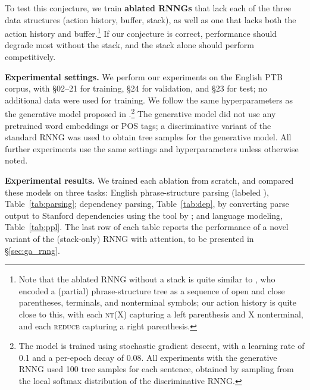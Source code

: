 \documentclass[11pt]{article}
\begin{document}
To test this conjecture, we train \textbf{ablated RNNGs} that lack each of the three data structures (action history, buffer, stack), as well as one that lacks both the action history and buffer.\footnote{Note that the ablated RNNG without a stack is quite similar to , who encoded a (partial)
 phrase-structure tree as a sequence of open and close parentheses, terminals, and nonterminal symbols; our action history is quite close to this, with each \textsc{nt}(X) capturing a left parenthesis and X nonterminal, and each \textsc{reduce} capturing a right parenthesis.}
If our conjecture is correct, performance should degrade most without the stack, and the stack alone should perform competitively.


\textbf{Experimental settings.} We perform our experiments on the English PTB corpus, with \S02--21 for training, \S24 for validation, and \S23 for test; no additional data were used for training. We follow the same hyperparameters as the generative model proposed in .\footnote{The model is trained using stochastic gradient descent, with a learning rate of 0.1 and a per-epoch decay of 0.08. All experiments with the generative RNNG used 100 tree samples for each sentence, obtained by sampling from the local softmax distribution of the discriminative RNNG.} The generative model did not use any pretrained word embeddings or POS tags; a discriminative variant of the standard RNNG was used to obtain tree samples for the generative model. All further experiments use the same settings and hyperparameters unless otherwise noted.

\textbf{Experimental results.} 
We trained each ablation from scratch, and compared these models on three tasks:  English phrase-structure parsing (labeled ), Table~\ref{tab:parsing}; dependency parsing, Table~\ref{tab:dep}, by converting parse output to Stanford dependencies \cite{demarneffe-06} using the tool by ; and language modeling, Table~\ref{tab:ppl}.  The last row of each table reports the performance of a novel variant of the (stack-only) RNNG with attention, to be presented in \S\ref{sec:ga_rnng}.
\end{document}
